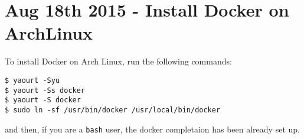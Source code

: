 \section{Aug 18th 2015 - Install Docker on ArchLinux}\label{sec:20150818}

To install Docker on Arch Linux, run the following commands:

\begin{lstlisting}[style=bashStyle]
$ yaourt -Syu
$ yaourt -Ss docker
$ yaourt -S docker
$ sudo ln -sf /usr/bin/docker /usr/local/bin/docker
\end{lstlisting}
and then, if you are a \lstinline!bash! user, the docker completaion has been already set up.
